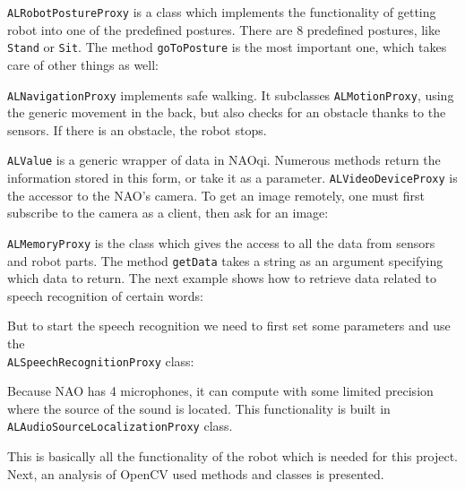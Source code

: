         
\vspace{5mm}
        \verb|ALRobotPostureProxy| is a class which implements the functionality of getting robot into one of the predefined postures. There are 8 predefined postures, like \verb|Stand| or \verb|Sit|. The method \verb|goToPosture| is the most important one, which takes care of other things as well:
        
\vspace{5mm}
        \verb|ALNavigationProxy| implements safe walking. It subclasses \verb|ALMotionProxy|, using the generic movement in the back, but also checks for an obstacle thanks to the sensors. If there is an obstacle, the robot stops. 
        
\vspace{5mm}
        \verb|ALValue| is a generic wrapper of data in NAOqi. Numerous methods return the information stored in this form, or take it as a parameter.
        \verb|ALVideoDeviceProxy| is the accessor to the NAO's camera. To get an image remotely, one must first subscribe to the camera as a client, then ask for an image:
        
\vspace{5mm}
        \verb|ALMemoryProxy| is the class which gives the access to all the data from sensors and robot parts. The method \verb|getData| takes a string as an argument specifying which data to return. The next example shows how to retrieve data related to speech recognition of certain words:
        
\vspace{5mm}
        But to start the speech recognition we need to first set some parameters and use the \\\verb|ALSpeechRecognitionProxy| class:
        
\vspace{5mm}
        Because NAO has 4 microphones, it can compute with some limited precision where the source of the sound is located. This functionality is built in \verb|ALAudioSourceLocalizationProxy| class.
        
        \vspace{5mm}
        This is basically all the functionality of the robot which is needed for this project. Next, an analysis of OpenCV used methods and classes is presented.


